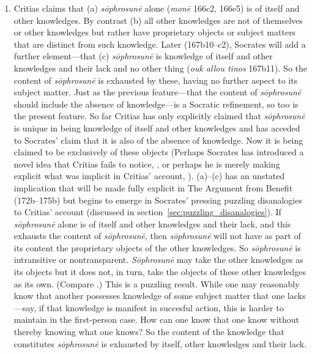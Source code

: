 \begin{enumerate}[(1)]
	\item Critias claims that (a) \emph{sōphrosunē} alone (\emph{monē} 166c2, 166e5) is of itself and other knowledges. By contrast (b) all other knowledges are not of themselves or other knowledges but rather have proprietary objects or subject matters that are distinct from such knowledge. Later (167b10–c2), Socrates will add a further element—that (c) \emph{sōphrosunē} is knowledge of itself and other knowledges and their lack and no other thing (\emph{ouk allou tinos} 167b11). So the content of \emph{sōphrosunē} is exhausted by these, having no further aspect to its subject matter. Just as the previous feature—that the content of \emph{sōphrosunē} should include the absence of knowledge—is a Socratic refinement, so too is the present feature. So far Critias has only explicitly claimed that \emph{sōphrosunē} is unique in being knowledge of itself and other knowledges and has acceded to Socrates' claim that it is also of the absence of knowledge. Now it is being claimed to be exclusively of these objects (Perhaps Socrates has introduced a novel idea that Critias fails to notice, \citealt[37–8]{Duncombe:2020gi}, or perhaps he is merely making explicit what was implicit in Critias' account, \citealt[]{Tsouna:2022aa}). (a)–(c) has an unstated implication that will be made fully explicit in The Argument from Benefit (172b–175b) but begins to emerge in Socrates' pressing puzzling disanalogies to Critias' account (discussed in section~\ref{sec:puzzling_disanalogies}). If \emph{sōphrosunē} alone is of itself and other knowledges and their lack, and this exhausts the content of \emph{sōphrosunē}, then \emph{sōphrosunē} will not have as part of its content the proprietary objects of the other knowledges. So \emph{sōphrosunē} is intransitive or nontransparent. \emph{Sōphrosunē} may take the other knowledges as its objects but it does not, in turn, take the objects of these other knowledges as its own. (Compare \citealt[190]{Tsouna:2022aa}.) This is a puzzling result. While one may reasonably know that another possesses knowledge of some subject matter that one lacks—say, if that knowledge is manifest in succesful action, this is harder to maintain in the first-person case. How can one know that one know without thereby knowing what one knows? So the content of the knowledge that constitutes \emph{sōphrosunē} is exhausted by itself, other knowledges and their lack.
\end{enumerate}

